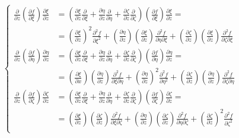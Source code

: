 \documentclass
[
a4paper,                      %
twoside,					  %
12pt,                         %
abstract,		      %
fleqn,                        %
]
{scrartcl} %
\begin{document}
\begin{description}
\begin{equation}
\begin{cases}
\frac{\partial}{\partial z}\left(\frac{\partial f}{\partial\xi}\right)\frac{\partial\xi}{\partial z}&=\left(\frac{\partial\xi}{\partial z}\frac{\partial}{\partial\xi}+\frac{\partial\eta}{\partial z}\frac{\partial}{\partial\eta}+\frac{\partial\zeta}{\partial z}\frac{\partial}{\partial\zeta}\right)\left(\frac{\partial f}{\partial\xi}\right)\frac{\partial\xi}{\partial z}=\\[5pt]
&=\left(\frac{\partial\xi}{\partial z}\right)^{2}\frac{\partial^{2} f}{\partial\xi^{2}}+\left(\frac{\partial\eta}{\partial z}\right)\left(\frac{\partial\xi}{\partial z}\right)\frac{\partial^{2} f}{\partial\eta\partial\xi}+\left(\frac{\partial\zeta}{\partial z}\right)\left(\frac{\partial\xi}{\partial z}\right)\frac{\partial^{2} f}{\partial\zeta\partial\xi}\\[10pt]
\frac{\partial}{\partial z}\left(\frac{\partial f}{\partial\eta}\right)\frac{\partial\eta}{\partial z}&=\left(\frac{\partial\xi}{\partial z}\frac{\partial}{\partial\xi}+\frac{\partial\eta}{\partial z}\frac{\partial}{\partial\eta}+\frac{\partial\zeta}{\partial z}\frac{\partial}{\partial\zeta}\right)\left(\frac{\partial f}{\partial\eta}\right)\frac{\partial\eta}{\partial z}=\\[5pt]
&=\left(\frac{\partial\xi}{\partial x}\right)\left(\frac{\partial\eta}{\partial z}\right)\frac{\partial^{2} f}{\partial\xi\partial\eta}+\left(\frac{\partial\eta}{\partial z}\right)^{2}\frac{\partial^{2} f}{\partial\eta^{2}}+\left(\frac{\partial\zeta}{\partial z}\right)\left(\frac{\partial\eta}{\partial z}\right)\frac{\partial^{2} f}{\partial\zeta\partial\eta}\\[10pt]
\frac{\partial}{\partial z}\left(\frac{\partial f}{\partial\zeta}\right)\frac{\partial\zeta}{\partial z}&=\left(\frac{\partial\xi}{\partial z}\frac{\partial}{\partial\xi}+\frac{\partial\eta}{\partial z}\frac{\partial}{\partial\eta}+\frac{\partial\zeta}{\partial z}\frac{\partial}{\partial\zeta}\right)\left(\frac{\partial f}{\partial\zeta}\right)\frac{\partial\zeta}{\partial z}=\\[5pt]
&=\left(\frac{\partial\xi}{\partial z}\right)\left(\frac{\partial\zeta}{\partial z}\right)\frac{\partial^{2} f}{\partial\xi\partial\zeta}+\left(\frac{\partial\eta}{\partial z}\right)\left(\frac{\partial\zeta}{\partial z}\right)\frac{\partial^{2} f}{\partial\eta\partial\zeta}+\left(\frac{\partial\zeta}{\partial z}\right)^{2}\frac{\partial^{2} f}{\partial\zeta^{2}}\\[5pt]
\end{cases}
\end{equation}


\end{description}
\end{document}

